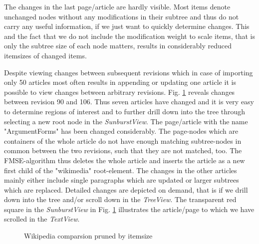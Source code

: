 The changes in the last page/article are hardly visible. Most items denote unchanged nodes without any modifications in their subtree and thus do not carry any useful information, if we just want to quickly determine changes. This and the fact that we do not include the modification weight to scale items, that is only the subtree size of each node matters, results in considerably reduced itemsizes of changed items.

Despite viewing changes between subsequent revisions which in case of importing only 50 articles most often results in appending or updating one article it is possible to view changes between arbitrary revisions. Fig. \ref{fig:wikivis-rev90106} reveals changes between revision 90 and 106. Thus seven articles have changed and it is very easy to determine regions of interest and to further drill down into the tree through selecting a new root node in the \emph{SunburstView}. The page/article with the name "ArgumentForms" has been changed considerably. The page-nodes which are containers of the whole article do not have enough matching subtree-nodes in common between the two revisions, such that they are not matched, too. The FMSE-algorithm thus deletes the whole article and inserts the article as a new first child of the "wikimedia" root-element. The changes in the other articles mainly either include single paragraphs which are updated or larger subtrees which are replaced. Detailed changes are depicted on demand, that is if we drill down into the tree and/or scroll down in the \emph{TreeView}. The transparent red square in the \emph{SunburstView} in Fig. \ref{fig:wikivis-rev90106} illustrates the article/page to which we have scrolled in the \emph{TextView}.

\begin{figure}[htb]
\caption{\label{fig:wikivis-rev90106} Wikipedia comparsion pruned by itemsize}
\end{figure}


